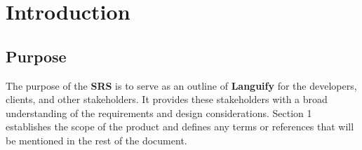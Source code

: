 \section{Introduction}
\label{sec:introduction}


\subsection{Purpose}
\label{sub:purpose}
The purpose of the \textbf{SRS} is to serve as an outline of \textbf{Languify} for the developers, clients, and other stakeholders. It provides these stakeholders with a broad understanding of the requirements and design considerations. Section 1 establishes the scope of the product and defines any terms or references that will be mentioned in the rest of the document.


